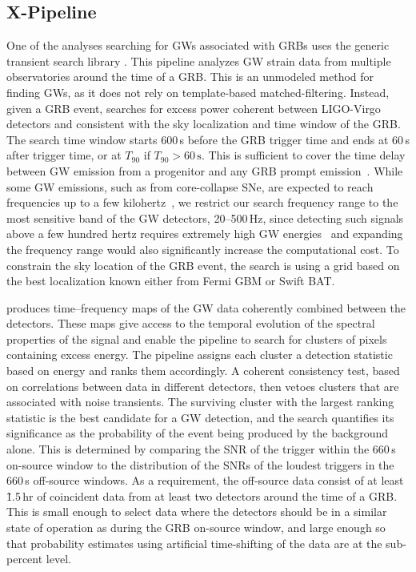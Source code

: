 \subsection{X-Pipeline}\label{sec:grb-x}

One of the analyses searching for \acp{GW} associated with \acp{GRB} uses the generic transient search library \xpip.
This pipeline analyzes \ac{GW} strain data from multiple observatories around the time of a \ac{GRB}.
This is an unmodeled method for finding \acp{GW}, as it does not rely on template-based matched-filtering.
Instead, given a \ac{GRB} event, \xpip searches for excess power coherent between LIGO-Virgo detectors and consistent with the sky localization and time window of the \ac{GRB}.
The search time window starts 600\,s before the GRB trigger time and ends at 60\,s after trigger time, or at $T_{90}$ if $T_{90} > 60\,\text{s}$.
This is sufficient to cover the time delay between GW emission from a progenitor and any GRB prompt emission~\citep{Koshut_1995, Aloy_2000, MacFadyen_2001, Zhang_2003, Lazzati_2005, Wang_2007, Burlon_2008, Burlon_2009, Lazzati_2009, Vedrenne_2009}.
While some GW emissions, such as from core-collapse SNe, are expected to reach frequencies up to a few kilohertz~\citep{Radice_2019}, we restrict our search frequency range to the most sensitive band of the GW detectors, 20–500\,Hz, since detecting such signals above a few hundred hertz requires extremely high GW energies~\citep{burst_o2} and expanding the frequency range would also significantly increase the computational cost. To constrain the sky location of the GRB event, the search is using a grid based on the best localization known either from Fermi \ac{GBM} or Swift \ac{BAT}.

\xpip produces time–frequency maps of the \ac{GW} data coherently combined between the detectors.
These maps give access to the temporal evolution of the spectral properties of the signal and enable the pipeline to search for clusters of pixels containing excess energy.
The pipeline assigns each cluster a detection statistic based on energy and ranks them accordingly.
A coherent consistency test, based on correlations between data in different detectors, then vetoes clusters that are associated with noise transients.
The surviving cluster with the largest ranking statistic is the best candidate for a GW detection, and the search quantifies its significance as the probability of the event being produced by the background alone.
This is determined by comparing the \ac{SNR} of the trigger within the 660\,s on-source window to the distribution of the \acp{SNR} of the loudest triggers in the 660\,s off-source windows.
As a requirement, the off-source data consist of at least \~1.5\,hr of coincident data from at least two detectors around the time of a \ac{GRB}.
This is small enough to select data where the detectors should be in a similar state of operation as during the \ac{GRB} on-source window, and large enough so that probability estimates using artificial time-shifting of the data are at the sub-percent level.

